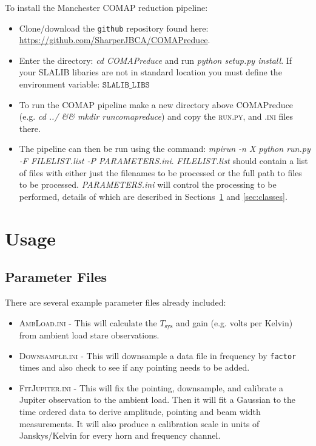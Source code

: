 \documentclass[11pt]{article}
\begin{document}
To install the Manchester COMAP reduction pipeline:
\begin{itemize}
  \item Clone/download the \texttt{github} repository found here: \url{https://github.com/SharperJBCA/COMAPreduce}.
  \item Enter the directory: \textit{cd COMAPreduce} and run \textit{python setup.py install}. If your SLALIB libaries are not in standard location you must define the environment variable: $\texttt{SLALIB\_LIBS}$
  \item To run the COMAP pipeline make a new directory above COMAPreduce (e.g. \textit{cd ../ \&\& mkdir runcomapreduce}) and copy the \textsc{run.py}, and \textsc{\*.ini} files there.
  \item The pipeline can then be run using the command: \textit{mpirun -n X python run.py -F FILELIST.list -P PARAMETERS.ini}. \textit{FILELIST.list} should contain a list of files with either just the filenames to be processed or the full path to files to be processed. \textit{PARAMETERS.ini} will control the processing to be performed, details of which are described in Sections~\ref{sec:usage} and \ref{sec:classes}.
\end{itemize}

\section{Usage}\label{sec:usage}

\subsection{Parameter Files}

There are several example parameter files already included:
\begin{itemize}
  \item \textsc{AmbLoad.ini}    - This will calculate the $T_\mathrm{sys}$ and gain (e.g. volts per Kelvin) from ambient load stare observations.
  \item \textsc{Downsample.ini} - This will downsample a data file in frequency by \texttt{factor} times and also check to see if any pointing needs to be added.
  \item \textsc{FitJupiter.ini} - This will fix the pointing, downsample, and calibrate a Jupiter observation to the ambient load. Then it will fit a Gaussian to the time ordered data to derive amplitude, pointing and beam width measurements. It will also produce a calibration scale in units of Janskys/Kelvin for every horn and frequency channel.
\end{itemize}
\end{document}
